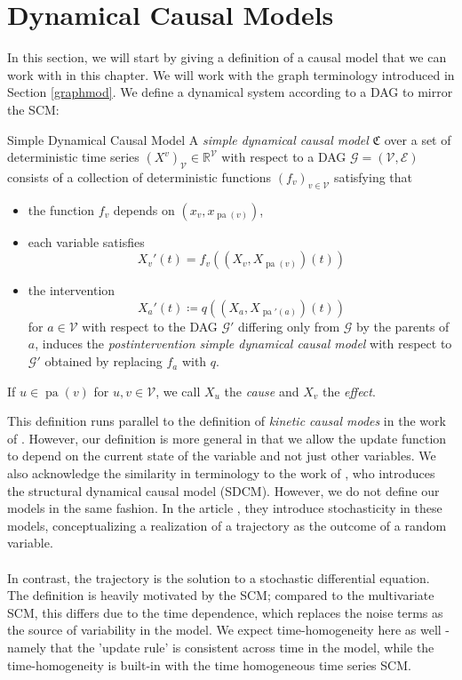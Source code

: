 \documentclass[11pt, a4paper]{memoir}
\theoremstyle{break}
\theoremstyle{break}
\theoremstyle{nonumberplain}
\newcommand{\mR}{\mathbb{R}}
\DeclareMathOperator{\pa}{pa}
\begin{document}
\section{Dynamical Causal Models}
In this section, we will start by giving a definition of a causal model that we can work with in this chapter. We will work with the graph terminology introduced in Section \ref{graphmod}. We define a dynamical system according to a DAG to mirror the SCM:
\begin{mydefinition}{Simple Dynamical Causal Model}
A \emph{simple dynamical causal model} $\mathfrak{C}$ over a set of deterministic time series $(X^v)_\mathcal{V}\in \mR^\mathcal{V}$ with respect to a DAG $\mathcal{G}=(\mathcal{V},\mathcal{E})$ consists of a collection of deterministic functions $(f_v)_{v\in \mathcal{V}}$ satisfying that
\begin{itemize}
	\item the function $f_v$ depends on $\left(x_v,x_{\pa(v)} \right)$,
	\item each variable satisfies
	$$ X_v'(t)=f_v\left(\left(X_v,X_{\pa(v)}\right)(t)\right)$$
	\item the intervention 
	$$X_a'
	(t)\coloneqq q\left((X_a,X_{\pa'(a)})(t)\right)$$ 
	for $a\in \mathcal{V}$ with respect to the DAG $\mathcal{G}'$ differing only from $\mathcal{G}$ by the parents of $a$, induces the \emph{postintervention simple dynamical causal model} with respect to $\mathcal{G}'$ obtained by replacing $f_a$ with $q$.
\end{itemize}
If $u\in \pa(v)$ for $u,v\in \mathcal{V}$, we call $X_u$ the \emph{cause} and $X_v$ the \emph{effect}. 
\end{mydefinition}
This definition runs parallel to the definition of \emph{kinetic causal modes} in the work of \cite{KCM}. However, our definition is more general in that we allow the update function to depend on the current state of the variable and not just other variables. We also acknowledge the similarity in terminology to the work of \cite{Bongers}, who introduces the structural dynamical causal model (SDCM). However, we do not define our models in the same fashion. In the article \cite{Bongers}, they introduce stochasticity in these models, conceptualizing a realization of a trajectory as the outcome of a random variable.\\\\
In contrast, the trajectory is the solution to a stochastic differential equation. The definition is heavily motivated by the SCM; compared to the multivariate SCM, this differs due to the time dependence, which replaces the noise terms as the source of variability in the model. We expect time-homogeneity  here as well - namely that the 'update rule' is consistent across time in the model, while the time-homogeneity is built-in with the time homogeneous time series SCM.\\\\
\end{document}

